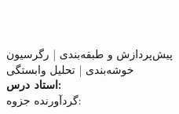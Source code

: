 \begin{titlepage}

\vspace*{5mm}
\begin{center}
\textcolor{white}{{\large جزوهٔ درسی و آموزشی}}\\[12mm]
\textcolor{white}{{\fontsize{36}{46}\selectfont\bfseries \BookTitle}}\\[5mm]
\textcolor{white!85!navy}{{\Large \BookSubtitle}}
\end{center}
\vspace{24mm}
\begin{center}
\begin{LTR}

\end{LTR}
\vspace{9mm}
{\large پیش‌پردازش و طبقه‌بندی \quad | \quad رگرسیون}\\[3mm]
{\large خوشه‌بندی \quad | \quad تحلیل وابستگی}\\[12mm]
{\color{navy}\large\textbf{استاد درس: \CourseInstructor}}\\[4mm]
{\color{navy}\large گردآورنده جزوه: \BookCompilers}
\end{center}
\vfill
\end{titlepage}

